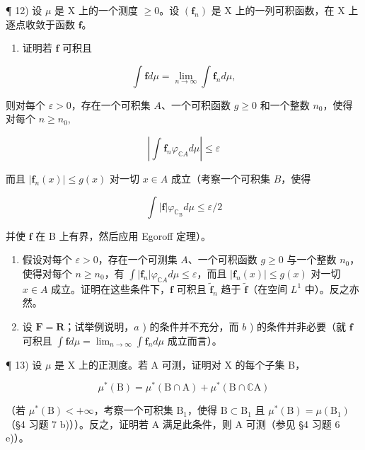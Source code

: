 ¶ 12) 设 \(\mu\) 是 X 上的一个测度 \(\geqslant 0\)。设 \((\mathbf{f}_n)\) 是 X 上的一列可积函数，在 X 上逐点收敛于函数 \(\mathbf{f}\)。

\begin{enumerate}
\def\labelenumi{\alph{enumi})}
\tightlist
\item
  证明若 \(\mathbf{f}\) 可积且
\end{enumerate}

\[
\int \mathbf {f} d \mu = \lim _ {n \rightarrow \infty} \int \mathbf {f} _ {n} d \mu ,
\]

则对每个 \(\varepsilon > 0\)，存在一个可积集 \(A\)、一个可积函数 \(g \geqslant 0\) 和一个整数 \(n_0\)，使得对每个 \(n \geqslant n_0\),

\[
\left| \int \mathbf {f} _ {n} \varphi_ {\mathbb {C} A} d \mu \right| \leqslant \varepsilon
\]

而且 \(|\mathbf{f}_n(x)| \leqslant g(x)\) 对一切 \(x \in A\) 成立（考察一个可积集 \(B\)，使得

\[
\int | \mathbf {f} | \varphi_ {\mathbb {C} _ {\mathrm{B}}} d \mu \leqslant \varepsilon / 2
\]

并使 \(\mathbf{f}\) 在 B 上有界，然后应用 Egoroff 定理）。

\begin{enumerate}
\def\labelenumi{\alph{enumi})}
\setcounter{enumi}{1}
\item
  假设对每个 \(\varepsilon > 0\)，存在一个可测集 \(A\)、一个可积函数 \(g \geqslant 0\) 与一个整数 \(n_0\)，使得对每个 \(n \geqslant n_0\)，有 \(\int |\mathbf{f}_n| \varphi_{\mathbb{C}A} d\mu \leqslant \varepsilon\)，而且 \(|\mathbf{f}_n(x)| \leqslant g(x)\) 对一切 \(x \in A\) 成立。证明在这些条件下，\(\mathbf{f}\) 可积且 \(\widetilde{\mathbf{f}}_n\) 趋于 \(\widetilde{\mathbf{f}}\)（在空间 \(L^1\) 中）。反之亦然。
\item
  设 \(\mathbf{F} = \mathbf{R}\)；试举例说明，\(a\) ) 的条件并不充分，而 \(b\) ) 的条件并非必要（就 \(\mathbf{f}\) 可积且 \(\int \mathbf{f} d\mu = \lim_{n \to \infty} \int \mathbf{f}_n d\mu\) 成立而言）。
\end{enumerate}

¶ 13) 设 \(\mu\) 是 X 上的正测度。若 A 可测，证明对 X 的每个子集 B，

\[
\mu^ {*} (\mathrm{B}) = \mu^ {*} (\mathrm{B} \cap \mathrm{A}) + \mu^ {*} (\mathrm{B} \cap \mathbb {C} \mathrm{A})
\]

（若 \(\mu^{*}(\mathrm{B}) < +\infty\)，考察一个可积集 \(\mathrm{B}_{1}\)，使得 \(\mathrm{B} \subset \mathrm{B}_{1}\) 且 \(\mu^{*}(\mathrm{B}) = \mu(\mathrm{B}_{1})\)（§4 习题 7 b)））。反之，证明若 A 满足此条件，则 A 可测（参见 §4 习题 6 e)）。

